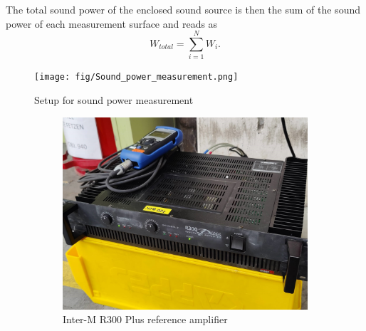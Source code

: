 The total sound power of the enclosed sound source is then the sum of the sound power of each measurement surface and reads as
\begin{equation}
    W_{total} = \sum_{i = 1}^{N} W_i\text{.}
\end{equation}

\begin{figure}[H]
\begin{center}
\texttt{[image: fig/Sound\_power\_measurement.png]}
\caption{Setup for sound power measurement}
\label{fig:soundpowersetup}
\end{center}
\end{figure}

\begin{figure}[H]
     \centering
     \begin{subfigure}[b]{0.5\textwidth}
         \centering
         \includegraphics[width=\textwidth]{fig/amplifier_and_signal_generator.jpg}
         \caption{Inter-M R300 Plus reference amplifier}
     \end{subfigure}
     \hspace{0.1\textwidth}
     \begin{subfigure}[b]{0.3\textwidth}
         \centering

\end{subfigure}
\end{figure}
